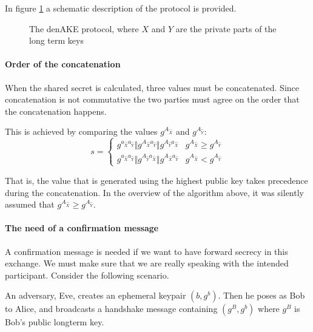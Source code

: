 In figure \ref{den_ake_schematic} a schematic description of the protocol is provided.

\begin{figure}[p]
  
  \caption[The denAKE protocol]{The denAKE protocol, where $X$ and $Y$ are the private parts of the long term keys}
  \label{den_ake_schematic}
\end{figure}

\paragraph{Order of the concatenation}
When the shared secret is calculated, three values must be concatenated. Since
concatenation is not commutative the two parties must agree on the order that the
concatenation happens.

This is achieved by comparing the values $g^{A_{\hat{X}}}$ and $g^{A_{\hat{Y}}}$:
\begin{equation*}
  s =
  \begin{cases}
    g^{a_{\hat{X}}a_{\hat{Y}}} \Vert g^{A_{\hat{X}}a_{\hat{Y}}} \Vert g^{A_{\hat{Y}}a_{\hat{X}}} & \text{$g^{A_{\hat{X}}} \geq g^{A_{\hat{Y}}}$}\\

    g^{a_{\hat{X}}a_{\hat{Y}}} \Vert g^{A_{\hat{Y}}a_{\hat{X}}} \Vert g^{A_{\hat{X}}a_{\hat{Y}}} &\text{$g^{A_{\hat{X}}} < g^{A_{\hat{Y}}}$}

  \end{cases}
\end{equation*}

That is, the value that is generated using the highest public key takes precedence during the
concatenation. In the overview of the algorithm above, it was silently assumed that $g^{A_{\hat{X}}} \geq g^{A_{\hat{Y}}}$.

\paragraph{The need of a confirmation message}
\label{confirm_message_explain}
A confirmation message is needed if we want to have forward secrecy in this exchange.
We must make sure that we are really speaking with the intended participant. Consider
the following scenario.

An adversary, Eve, creates an ephemeral keypair $(b, g^b)$. Then he poses as Bob to Alice,
and broadcasts a handshake message containing $(g^B,g^b)$ where $g^B$ is Bob's
public longterm key.

